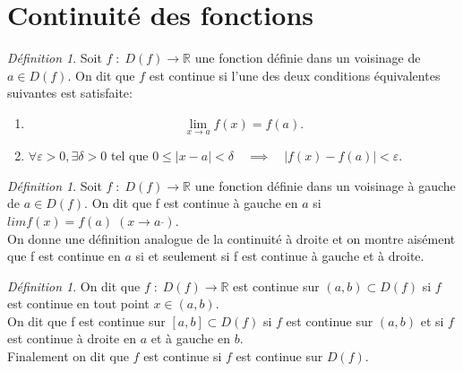 \documentclass[oneside,12pt,french,table]{book}
\theoremstyle{definition}
\theoremstyle{plain}
\theoremstyle{remark}
\newtheorem{defi}[definition]{Définition}
\newcommand{\Rr}{{\mathbb{R}}}
\begin{document}
\section{Continuité des fonctions}
\begin{defi}
    Soit $f\;:\;D(f)\longrightarrow\Rr$ une fonction définie dans un voisinage de $a \in D(f)$. 
    On dit que $f$ est continue si l'une des deux conditions équivalentes suivantes est satisfaite:
    \begin{enumerate}
        \item \[\lim_{x\rightarrow a}f(x)=f(a).\]
        \item $\forall \varepsilon>0, \exists \delta>0$ tel que $
        0\leq |x-a|<\delta \quad \implies \quad |f(x)-f(a)|<\varepsilon$.
    \end{enumerate}
\end{defi}
\begin{defi}
    Soit  $f\;:\;D(f)\longrightarrow\Rr$ une fonction définie dans un voisinage à gauche de $a \in D(f)$. On dit que f est continue à gauche en $a$ si $limf(x)=f(a)\;(x\rightarrow a^{\_})$.
\\
    On donne une définition analogue de la continuité à droite et on montre aisément que f est continue en $a$ si et seulement si f est continue à gauche et à droite.
\end{defi}
\begin{defi}
    On dit que  $f\;:\;D(f)\longrightarrow\Rr$ est continue sur $(a,b)\subset D(f)$ si $f$ est continue en tout point $x\in(a,b)$.
\\
    On dit que f est continue sur $[a,b]\subset D(f)$ si $f$ est continue sur $(a,b)$ et si $f$ est continue à droite en $a$ et à gauche en $b$.
\\
    Finalement on dit que $f$ est continue si $f$ est continue sur $D(f)$.
\end{defi}
\end{document}
